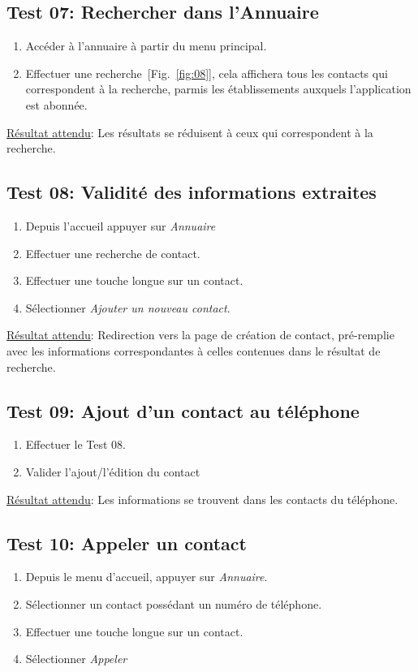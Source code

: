   \subsection{Test 07: Rechercher dans l'Annuaire}
    \begin{enumerate}
    \item Accéder à l'annuaire à partir du menu principal.
    \item Effectuer une recherche~[Fig.~\ref{fig:08}], cela affichera tous les contacts qui correspondent à la recherche, parmis les établissements auxquels l'application est abonnée.
    \end{enumerate}

    \underline{Résultat attendu}: Les résultats se réduisent à ceux qui correspondent à la recherche.

  \subsection{Test 08: Validité des informations extraites}
    \begin{enumerate}
    \item Depuis l'accueil appuyer sur \emph{Annuaire}
    \item Effectuer une recherche de contact.
    \item Effectuer une touche longue sur un contact.
    \item Sélectionner \emph{Ajouter un nouveau contact}.
    \end{enumerate}

    \underline{Résultat attendu}: Redirection vers la page de création de contact, pré-remplie avec les informations correspondantes à celles contenues dans le résultat de recherche.

  \subsection{Test 09: Ajout d'un contact au téléphone}
    \begin{enumerate}
    \item Effectuer le Test 08.
    \item Valider l'ajout/l'édition du contact
    \end{enumerate}

    \underline{Résultat attendu}: Les informations se trouvent dans les contacts du téléphone.

  \subsection{Test 10: Appeler un contact}
    \begin{enumerate}
    \item Depuis le menu d'accueil, appuyer sur \emph{Annuaire}.
    \item Sélectionner un contact possédant un numéro de téléphone.
    \item Effectuer une touche longue sur un contact.
    \item Sélectionner \emph{Appeler}
    \end{enumerate}

